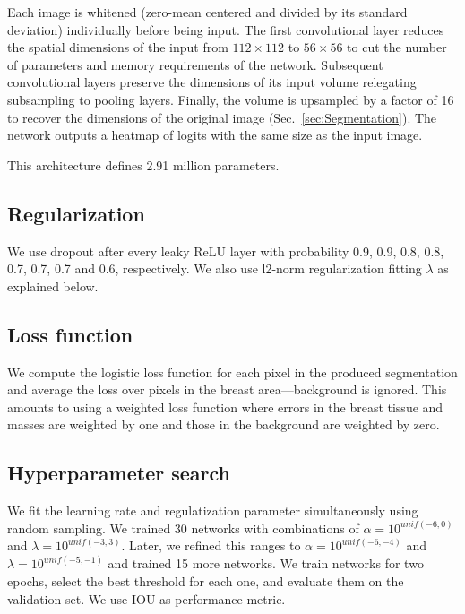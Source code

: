 	Each image is whitened (zero-mean centered and divided by its standard deviation) individually before being input. The first convolutional layer reduces the spatial dimensions of the input from $112 \times 112$ to $56 \times 56$ to cut the number of parameters and memory requirements of the network. Subsequent convolutional layers preserve the dimensions of its input volume relegating subsampling to pooling layers. Finally, the volume is upsampled by a factor of 16 to recover the dimensions of the original image (Sec.~\ref{sec:Segmentation}). The network outputs a heatmap of logits with the same size as the input image.

	This architecture defines 2.91 million parameters. %
	

\subsection{Regularization}
\label{subsec:Regularization1}
We use dropout after every leaky ReLU layer with probability 0.9, 0.9, 0.8, 0.8, 0.7, 0.7, 0.7 and 0.6, respectively. We also use l2-norm regularization fitting $\lambda$ as explained below.

\subsection{Loss function}
We compute the logistic loss function for each pixel in the produced segmentation and average the loss over pixels in the breast area---background is ignored. This amounts to using a weighted loss function where errors in the breast tissue and masses are weighted by one and those in the background are weighted by zero.

\subsection{Hyperparameter search}
We fit the learning rate and regulatization parameter simultaneously using random sampling. We trained 30 networks with combinations of $\alpha = 10^{unif(-6,0)}$ and $\lambda = 10^{unif(-3,3)}$. Later, we refined this ranges to $\alpha = 10^{unif(-6,-4)}$ and $\lambda = 10^{unif(-5,-1)}$ and trained 15 more networks. We train networks for two epochs, select the best threshold for each one, and evaluate them on the validation set. We use IOU as performance metric.
